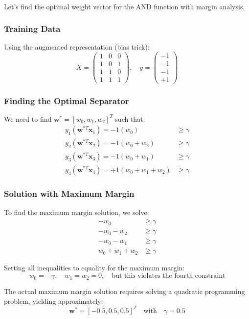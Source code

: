 Let's find the optimal weight vector for the AND function with margin analysis.

\subsubsection{Training Data}
Using the augmented representation (bias trick):
\[
X = \begin{pmatrix}
1 & 0 & 0 \\
1 & 0 & 1 \\
1 & 1 & 0 \\
1 & 1 & 1
\end{pmatrix}, \quad
y = \begin{pmatrix}
-1 \\
-1 \\
-1 \\
+1
\end{pmatrix}
\]

\subsubsection{Finding the Optimal Separator}
We need to find \(\mathbf{w}^* = [w_0, w_1, w_2]^T\) such that:
\begin{align}
y_1(\mathbf{w}^{*T} \mathbf{x}_1) = -1(w_0) &\geq \gamma \\
y_2(\mathbf{w}^{*T} \mathbf{x}_2) = -1(w_0 + w_2) &\geq \gamma \\
y_3(\mathbf{w}^{*T} \mathbf{x}_3) = -1(w_0 + w_1) &\geq \gamma \\
y_4(\mathbf{w}^{*T} \mathbf{x}_4) = +1(w_0 + w_1 + w_2) &\geq \gamma
\end{align}

\subsubsection{Solution with Maximum Margin}
To find the maximum margin solution, we solve:
\begin{align}
-w_0 &\geq \gamma \\
-w_0 - w_2 &\geq \gamma \\
-w_0 - w_1 &\geq \gamma \\
w_0 + w_1 + w_2 &\geq \gamma
\end{align}

Setting all inequalities to equality for the maximum margin:
\[w_0 = -\gamma, \quad w_1 = w_2 = 0, \quad \text{but this violates the fourth constraint}\]

The actual maximum margin solution requires solving a quadratic programming problem, yielding approximately:
\[\mathbf{w}^* = [-0.5, 0.5, 0.5]^T \quad \text{with} \quad \gamma = 0.5\]

